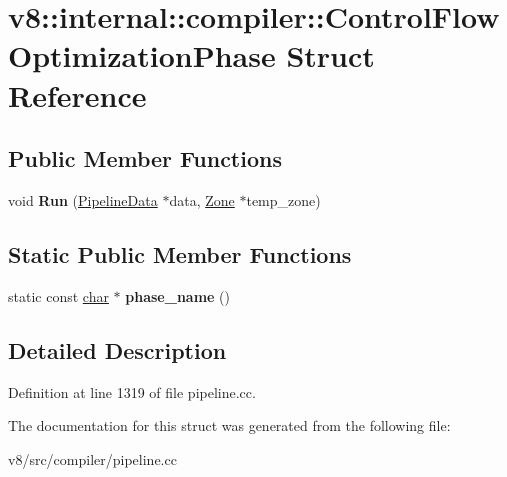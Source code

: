\hypertarget{structv8_1_1internal_1_1compiler_1_1ControlFlowOptimizationPhase}{}\section{v8\+:\+:internal\+:\+:compiler\+:\+:Control\+Flow\+Optimization\+Phase Struct Reference}
\label{structv8_1_1internal_1_1compiler_1_1ControlFlowOptimizationPhase}
\subsection*{Public Member Functions}
\begin{DoxyCompactItemize}
\item 
\mbox{\label{structv8_1_1internal_1_1compiler_1_1ControlFlowOptimizationPhase_ae5a8379748dd956511246378cccc12cb}} 
void {\bfseries Run} (\mbox{\hyperlink{classv8_1_1internal_1_1compiler_1_1PipelineData}{Pipeline\+Data}} $\ast$data, \mbox{\hyperlink{classv8_1_1internal_1_1Zone}{Zone}} $\ast$temp\+\_\+zone)
\end{DoxyCompactItemize}
\subsection*{Static Public Member Functions}
\begin{DoxyCompactItemize}
\item 
\mbox{\label{structv8_1_1internal_1_1compiler_1_1ControlFlowOptimizationPhase_a1861ee2d2247c820104232d19eeeb4a1}} 
static const \mbox{\hyperlink{classchar}{char}} $\ast$ {\bfseries phase\+\_\+name} ()
\end{DoxyCompactItemize}


\subsection{Detailed Description}


Definition at line 1319 of file pipeline.\+cc.



The documentation for this struct was generated from the following file\+:\begin{DoxyCompactItemize}
\item 
v8/src/compiler/pipeline.\+cc\end{DoxyCompactItemize}

